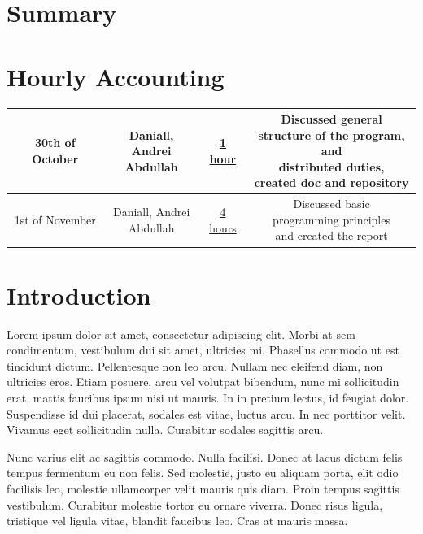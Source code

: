 \documentclass{article}
\begin{document}
\pagebreak

\section{Summary}
\section{Hourly Accounting}
\begin{center}
    \begin{tabular}{| c | c | c | c |}
      \hline
      30th of October & \makecell{Daniall, Andrei \\ Abdullah} & \underline{1 hour} & \makecell{Discussed general \\ structure of the program, and \\ distributed duties, \\ created doc and repository} \\
      \hline
      1st of November & \makecell{Daniall, Andrei \\ Abdullah} & \underline{4 hours} & \makecell{Discussed basic \\ programming principles \\ and created the report} \\
      \hline
    \end{tabular}
\end{center}

\pagebreak

\tableofcontents

\pagebreak

\section{Introduction}
Lorem ipsum dolor sit amet, consectetur adipiscing elit. Morbi at sem condimentum, vestibulum dui sit
amet, ultricies mi. Phasellus commodo ut est tincidunt dictum. Pellentesque non leo arcu. Nullam nec
eleifend diam, non ultricies eros. Etiam posuere, arcu vel volutpat bibendum, nunc mi sollicitudin erat,
mattis faucibus ipsum nisi ut mauris. In in pretium lectus, id feugiat dolor. Suspendisse id dui placerat,
sodales est vitae, luctus arcu. In nec porttitor velit. Vivamus eget sollicitudin nulla. Curabitur sodales
sagittis arcu.
\par
Nunc varius elit ac sagittis commodo. Nulla facilisi. Donec at lacus dictum felis tempus fermentum eu
non felis. Sed molestie, justo eu aliquam porta, elit odio facilisis leo, molestie ullamcorper velit mauris
quis diam. Proin tempus sagittis vestibulum. Curabitur molestie tortor eu ornare viverra. Donec risus
ligula, tristique vel ligula vitae, blandit faucibus leo. Cras at mauris massa.
\end{document}
